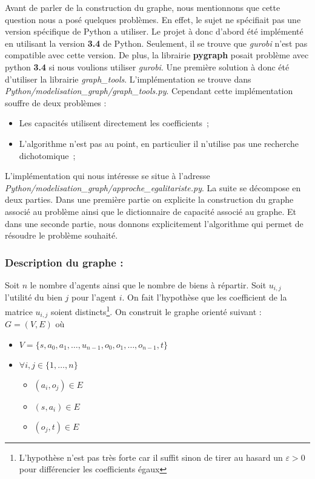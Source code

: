 \documentclass[a4paper, titlepage, oneside, 12pt]{article}%
\begin{document}
Avant de parler de la construction du graphe, nous mentionnons que cette question nous a posé quelques problèmes. En effet, le sujet ne spécifiait pas une version spécifique de Python a utiliser. Le projet à donc d'abord été implémenté en utilisant la version \textbf{3.4} de Python. Seulement, il se trouve que \textit{gurobi} n'est pas compatible avec cette version. De plus, la librairie \textbf{pygraph} posait problème avec python \textbf{3.4} si nous voulions utiliser \textit{gurobi}. Une première solution à donc été d'utiliser la librairie \textit{graph\_tools}. L'implémentation se trouve dans \textit{Python/modelisation\_graph/graph\_tools.py}. Cependant cette implémentation souffre de deux problèmes :
\begin{itemize}
\item Les capacités utilisent directement les coefficients~;
\item L'algorithme n'est pas au point, en particulier il n'utilise pas une recherche dichotomique~;
\end{itemize}

L'implémentation qui nous intéresse se situe à l'adresse \textit{Python/modelisation\_graph/approche\_egalitariste.py}. La suite se décompose en deux parties. Dans une première partie on explicite la construction du graphe associé au problème ainsi que le dictionnaire de capacité associé au graphe. Et dans une seconde partie, nous donnons explicitement l'algorithme qui permet de résoudre le problème souhaité.

\subsubsection{Description du graphe : } 

Soit $n$ le nombre d'agents ainsi que le nombre de biens à répartir. Soit $u_{i,j}$ l'utilité du bien $j$ pour l'agent $i$. 
On fait l'hypothèse que les coefficient de la matrice $u_{i,j}$ soient distincts\footnote{L'hypothèse n'est pas très forte car il suffit sinon de tirer au hasard un $\varepsilon>0$ pour différencier les coefficients égaux}. 
On construit le graphe orienté suivant :
$G=(V,E)$ où 
\begin{itemize}
\item $V=\{s,a_0,a_1,\dots, u_{n-1}, o_0,o_1,\dots, o_{n-1},t\}$
\item $\forall i,j \in \{1,\dots, n\} $
  \begin{itemize}
  \item $(a_i,o_j)\in E $
  \item $(s,a_i)\in E$
  \item $(o_j,t) \in E$
  \end{itemize}
\end{itemize}  
\end{document}
